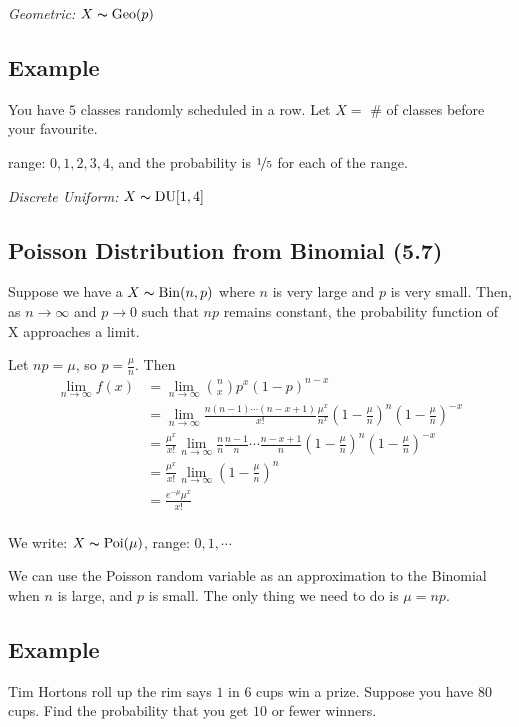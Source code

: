\emph{Geometric:} $ X \thicksim \operatorname{Geo}(p) $

\subsection{Example}
You have $ 5 $ classes randomly scheduled in a row.
Let $ X= $ \# of classes before your favourite.

range: $ 0,1,2,3,4 $, and the probability is $ \nicefrac{1}{5} $ for each
of the range.

\emph{Discrete Uniform:} $ X \thicksim \operatorname{DU}[1,4] $

\subsection{Poisson Distribution from Binomial (5.7)}
Suppose we have a $ X \thicksim \operatorname{Bin}(n,p) $ where $ n $ is very large
and $ p $ is very small. Then, as $ n\rightarrow \infty $ and $ p\rightarrow 0 $
such that $ np $ remains constant, the probability function of X
approaches a limit.

Let $ np=\mu $, so $ p=\frac{\mu}{n} $. Then
\begin{align*}
    \lim\limits_{{n} \to {\infty}} f(x)
    &=\lim\limits_{{n} \to {\infty}} \binom{n}{x}p^x(1-p)^{n-x}\\
    &=\lim\limits_{{n} \to {\infty}} \frac{n(n-1)\cdots(n-x+1)}{x!}
    \frac{\mu^x}{n^x} (1-\frac{\mu}{n})^n(1-\frac{\mu}{n})^{-x}\\
    &=\frac{\mu^x}{x!} \lim\limits_{{n} \to {\infty}} \frac{n}{n}
    \frac{n-1}{n} \cdots \frac{n-x+1}{n}(1-\frac{\mu}{n})^n(1-\frac{\mu}{n})^{-x}\\
    &=\frac{\mu^x}{x!} \lim\limits_{{n} \to {\infty}} (1-\frac{\mu}{n})^n\\
    &=\frac{e^{-\mu}\mu^x}{x!}\\
\end{align*}

We write: $ X \thicksim \operatorname{Poi}(\mu) $, range: $ 0,1,\cdots $

We can use the Poisson random variable as an approximation to the Binomial
when $ n $ is large, and $ p $ is small. The only thing we need to do
is $ \mu=np $.

\subsection{Example}
Tim Hortons roll up the rim says $ 1 $ in $ 6 $ cups win a prize. Suppose
you have $ 80 $ cups. Find the probability that you get $ 10 $ or fewer
winners.

